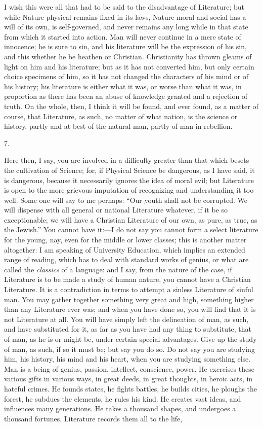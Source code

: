 I wish this were all that had to be said to the disadvantage of
Literature; but while Nature physical remains fixed in its laws,
Nature moral and social has a will of its own, is self-governed, and
never remains any long while in that state from which it started into
action. Man will never continue in a mere state of innocence; he is
sure to sin, and his literature will be the expression of his sin, and
this whether he be heathen or Christian. Christianity has thrown
gleams of light on him and his literature; but as it has not converted
him, but only certain choice specimens of him, so it has not changed
the characters of his mind or of his history; his literature is either
what it was, or worse than what it was, in proportion as there has
been an abuse of knowledge granted and a rejection of truth. On the
whole, then, I think it will be found, and ever found, as a matter of
course, that Literature, as such, no matter of what nation, is the
science or history, partly and at best of the natural man, partly of
man in rebellion.

7.

Here then, I say, you are involved in a difficulty greater than
that which besets the cultivation of Science; for, if Physical Science
be dangerous, as I have said, it is dangerous, because it necessarily
ignores the idea of moral evil; but Literature is open to the more
grievous imputation of recognizing and understanding it too well. Some
one will say to me perhaps: ``Our youth shall not be corrupted. We
will dispense with all general or national Literature whatever, if it
be so exceptionable; we will have a Christian Literature of our own,
as pure, as true, as the Jewish.'' You cannot have it:—I do not
say you cannot form a select literature for the young, nay, even for
the middle or lower classes; this is another matter altogether: I am
speaking of University Education, which implies an extended range of
reading, which has to deal with standard works of genius, or what are
called the \emph{classics} of a language: and I say, from the nature
of the case, if Literature is to be made a study of human nature, you
cannot have a Christian Literature. It is a contradiction in terms to
attempt a sinless Literature of sinful man. You may gather together
something very great and high, something higher than any Literature
ever was; and when you have done so, you will find that it is not
Literature at all. You will have simply left the delineation of man,
as such, and have substituted for it, as far as you have had any thing
to substitute, that of man, as he is or might be, under certain
special advantages. Give up the study of man, as such, if so it must
be; but say you do so. Do not say you are studying him, his history,
his mind and his heart, when you are studying something else. Man is a
being of genius, passion, intellect, conscience, power. He exercises
these various gifts in various ways, in great deeds, in great
thoughts, in heroic acts, in hateful crimes. He founds states, he
fights battles, he builds cities, he ploughs the forest, he subdues
the elements, he rules his kind. He creates vast ideas, and influences
many generations. He takes a thousand shapes, and undergoes a thousand
fortunes. Literature records them all to the life,

